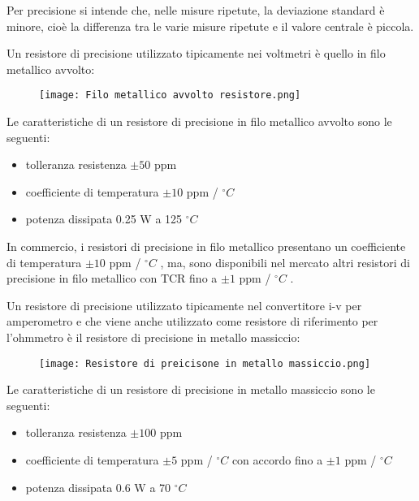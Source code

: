 Per precisione si intende che, nelle misure ripetute, la deviazione standard è minore, 
cioè la differenza tra le varie misure ripetute e il valore centrale è piccola. \newline 

Un resistore di precisione utilizzato tipicamente nei voltmetri è quello in filo metallico avvolto: 

\begin{figure}[h]
    \centering
    \texttt{[image: Filo metallico avvolto resistore.png]}
\end{figure}

Le caratteristiche di un resistore di precisione in filo metallico avvolto sono le seguenti: 

\begin{itemize}
    \item tolleranza resistenza $\pm 50$ ppm 
    \item coefficiente di temperatura $\pm 10 $ ppm / $^{\circ} C$ 
    \item potenza dissipata 0.25 W a 125 $^{\circ} C$
\end{itemize}

In commercio, i resistori di precisione in filo metallico presentano un coefficiente di temperatura $\pm 10 $ ppm / $^{\circ} C$ , 
ma, sono disponibili nel mercato altri resistori di precisione in filo metallico con TCR fino a $\pm 1 $ ppm / $^{\circ} C$ . \newline 

Un resistore di precisione utilizzato tipicamente nel convertitore i-v per amperometro e che viene anche utilizzato come resistore di riferimento per l'ohmmetro 
è il resistore di precisione in metallo massiccio: 

\begin{figure}[h]
    \centering
    \texttt{[image: Resistore di preicisone in metallo massiccio.png]}
\end{figure}

Le caratteristiche di un resistore di precisione in metallo massiccio sono le seguenti: 

\begin{itemize}
    \item tolleranza resistenza $\pm 100$ ppm 
    \item coefficiente di temperatura $\pm 5 $ ppm / $^{\circ} C$ con accordo fino a $\pm 1 $ ppm / $^{\circ} C$ 
    \item potenza dissipata 0.6 W a 70 $^{\circ} C$
\end{itemize}

